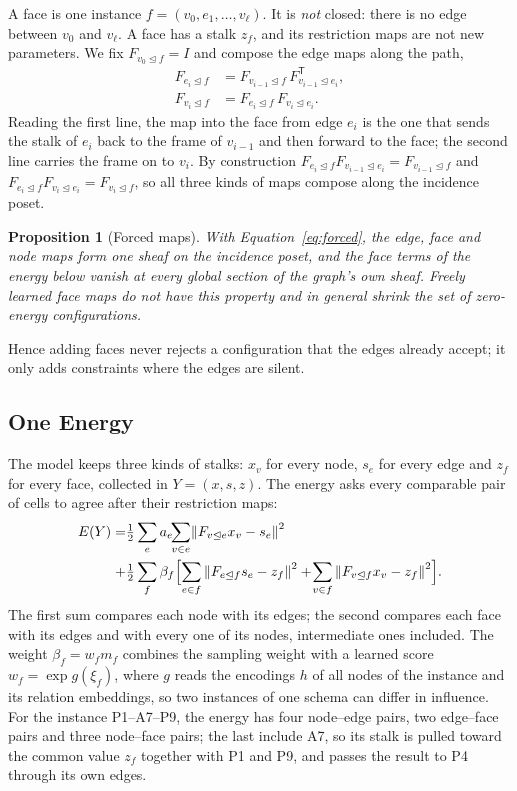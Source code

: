 \documentclass{article}
\newtheorem{proposition}{Proposition}
\newcommand{\norm}[1]{\left\lVert #1\right\rVert}
\newcommand{\transpose}{\mathsf{T}}
\newcommand{\inc}{\trianglelefteq}
\begin{document}
A face is one instance $f=(v_0,e_1,\ldots,v_\ell)$. It is \emph{not} closed: there is no edge between $v_0$ and $v_\ell$. A face has a stalk $z_f$, and its restriction maps are not new parameters. We fix $F_{v_0\inc f}=I$ and compose the edge maps along the path,
\begin{equation}
\begin{aligned}
  F_{e_i\inc f}&=F_{v_{i-1}\inc f}\,F_{v_{i-1}\inc e_i}^{\transpose},\\
  F_{v_i\inc f}&=F_{e_i\inc f}\,F_{v_i\inc e_i}.
\end{aligned}
\label{eq:forced}
\end{equation}
Reading the first line, the map into the face from edge $e_i$ is the one that sends the stalk of $e_i$ back to the frame of $v_{i-1}$ and then forward to the face; the second line carries the frame on to $v_i$. By construction $F_{e_i\inc f}F_{v_{i-1}\inc e_i}=F_{v_{i-1}\inc f}$ and $F_{e_i\inc f}F_{v_i\inc e_i}=F_{v_i\inc f}$, so all three kinds of maps compose along the incidence poset.

\begin{proposition}[Forced maps]\label{prop:forced}
With Equation~\eqref{eq:forced}, the edge, face and node maps form one sheaf on the incidence poset, and the face terms of the energy below vanish at every global section of the graph's own sheaf. Freely learned face maps do not have this property and in general shrink the set of zero-energy configurations.
\end{proposition}
Hence adding faces never rejects a configuration that the edges already accept; it only adds constraints where the edges are silent.

\subsection{One Energy}
\label{sec:energy}
The model keeps three kinds of stalks: $x_v$ for every node, $s_e$ for every edge and $z_f$ for every face, collected in $Y=(x,s,z)$. The energy asks every comparable pair of cells to agree after their restriction maps:
\begin{equation}
\begin{aligned}
  E(Y)=&\tfrac12\sum_{e}a_e\!\!\sum_{v\in e}\!\norm{F_{v\inc e}x_v-s_e}^2\\
  +&\tfrac12\sum_{f}\beta_f\Bigl[\sum_{e\in f}\norm{F_{e\inc f}s_e-z_f}^2+\!\sum_{v\in f}\norm{F_{v\inc f}x_v-z_f}^2\Bigr].
\end{aligned}
\label{eq:energy}
\end{equation}
The first sum compares each node with its edges; the second compares each face with its edges and with every one of its nodes, intermediate ones included. The weight $\beta_f=w_fm_f$ combines the sampling weight with a learned score $w_f=\exp g(\xi_f)$, where $g$ reads the encodings $h$ of all nodes of the instance and its relation embeddings, so two instances of one schema can differ in influence. For the instance P1--A7--P9, the energy has four node--edge pairs, two edge--face pairs and three node--face pairs; the last include A7, so its stalk is pulled toward the common value $z_f$ together with P1 and P9, and passes the result to P4 through its own edges.
\end{document}
